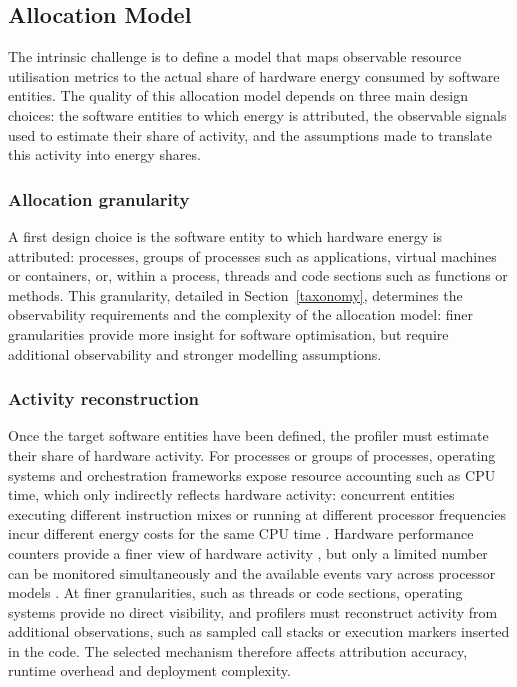 \documentclass[
  acmsmall,
  screen,
  review,
  xcolor={dvipsnames,usenames}
]{acmart}
\begin{document}
\subsection{Allocation Model}

The intrinsic challenge is to define a model that maps observable resource utilisation metrics to the actual share of hardware energy consumed by software entities. The quality of this allocation model depends on three main design choices: the software entities to which energy is attributed, the observable signals used to estimate their share of activity, and the assumptions made to translate this activity into energy shares.

\subsubsection{\textbf{Allocation granularity}}

A first design choice is the software entity to which hardware energy is attributed: processes, groups of processes such as applications, virtual machines or containers, or, within a process, threads and code sections such as functions or methods. This granularity, detailed in Section~\ref{taxonomy}, determines the observability requirements and the complexity of the allocation model: finer granularities provide more insight for software optimisation, but require additional observability and stronger modelling assumptions.

\subsubsection{\textbf{Activity reconstruction}} \label{activity reconstruction}

Once the target software entities have been defined, the profiler must estimate their share of hardware activity. For processes or groups of processes, operating systems and orchestration frameworks expose resource accounting such as CPU time, which only indirectly reflects hardware activity: concurrent entities executing different instruction mixes or running at different processor frequencies incur different energy costs for the same CPU time \cite{kansalVirtualMachinePower2010,noureddineMonitoringEnergyHotspots2015}. Hardware performance counters provide a finer view of hardware activity \cite{colmantProcesslevelPowerEstimation2015,fieniSmartWattsSelfCalibratingSoftwareDefined2020}, but only a limited number can be monitored simultaneously and the available events vary across processor models \cite{kansalVirtualMachinePower2010,nowakOverheadProfilingUsing2014}. At finer granularities, such as threads or code sections, operating systems provide no direct visibility, and profilers must reconstruct activity from additional observations, such as sampled call stacks or execution markers inserted in the code. The selected mechanism therefore affects attribution accuracy, runtime overhead and deployment complexity.
\end{document}
